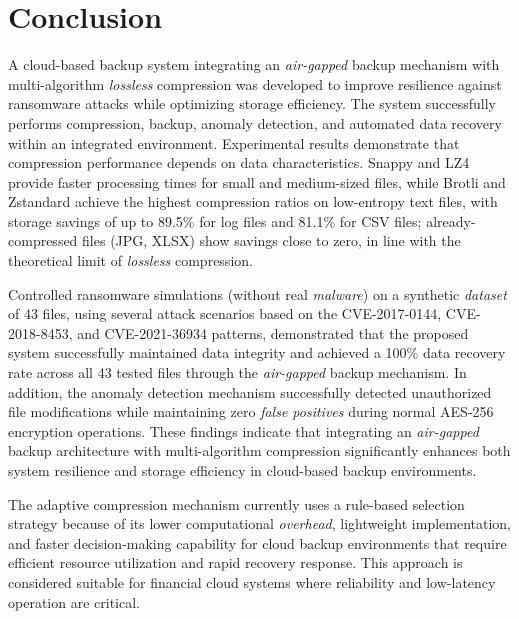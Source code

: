 \documentclass{iaesarticle}
\begin{document}
\section{Conclusion}
\label{sec:conclusion}
A cloud-based backup system integrating an \textit{air-gapped} backup mechanism with multi-algorithm \textit{lossless} compression was developed to improve resilience against ransomware attacks while optimizing storage efficiency. The system successfully performs compression, backup, anomaly detection, and automated data recovery within an integrated environment. Experimental results demonstrate that compression performance depends on data characteristics. Snappy and LZ4 provide faster processing times for small and medium-sized files, while Brotli and Zstandard achieve the highest compression ratios on low-entropy text files, with storage savings of up to 89.5\% for log files and 81.1\% for CSV files; already-compressed files (JPG, XLSX) show savings close to zero, in line with the theoretical limit of \textit{lossless} compression.

Controlled ransomware simulations (without real \textit{malware}) on a synthetic \textit{dataset} of 43 files, using several attack scenarios based on the CVE-2017-0144, CVE-2018-8453, and CVE-2021-36934 patterns, demonstrated that the proposed system successfully maintained data integrity and achieved a 100\% data recovery rate across all 43 tested files through the \textit{air-gapped} backup mechanism. In addition, the anomaly detection mechanism successfully detected unauthorized file modifications while maintaining zero \textit{false positives} during normal AES-256 encryption operations. These findings indicate that integrating an \textit{air-gapped} backup architecture with multi-algorithm compression significantly enhances both system resilience and storage efficiency in cloud-based backup environments.

The adaptive compression mechanism currently uses a rule-based selection strategy because of its lower computational \textit{overhead}, lightweight implementation, and faster decision-making capability for cloud backup environments that require efficient resource utilization and rapid recovery response. This approach is considered suitable for financial cloud systems where reliability and low-latency operation are critical.
\end{document}
